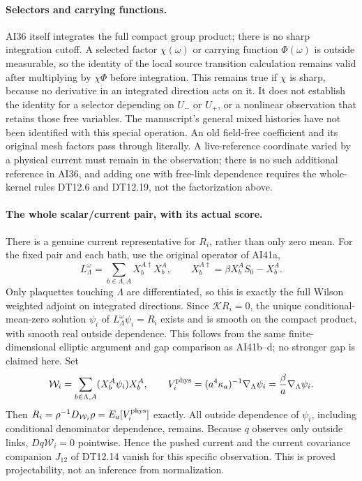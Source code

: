 \documentclass[11pt]{article}
\begin{document}
\paragraph{Selectors and carrying functions.}
AI36 itself integrates the full compact group product; there is no sharp integration cutoff.
A selected factor $\chi(\omega)$ or carrying function $\Phi(\omega)$ is outside measurable,
so the identity of the local source transition calculation remains valid after multiplying by $\chi\Phi$ before integration.
This remains true if $\chi$ is sharp, because no derivative in an integrated direction
acts on it. It does not establish the identity for a selector depending on $U_-$ or $U_+$,
or a nonlinear observation that retains those free variables. The manuscript's general
mixed histories have not been identified with this special operation.
An old field-free coefficient and its original mesh factors pass through literally.
A live-reference coordinate varied by a physical current must remain in the observation;
there is no such additional reference in AI36, and adding one with free-link dependence
requires the whole-kernel rules DT12.6 and DT12.19, not the factorization above.

\paragraph{The whole scalar/current pair, with its actual score.}
There is a genuine current representative for $R_i$, rather than only zero mean.
For the fixed pair and each bath, use the original operator of AI41a,
\[
 L^\omega_\Lambda=\sum_{b\in\Lambda,A}X_b^{A\dagger}X_b^A,
 \qquad X_b^{A\dagger}=\beta X_b^AS_0-X_b^A.
\]
Only plaquettes touching $\Lambda$ are differentiated, so this is exactly the full
Wilson weighted adjoint on integrated directions. Since $\mathcal K R_i=0$, the
unique conditional-mean-zero solution $\psi_i$ of $L^\omega_\Lambda\psi_i=R_i$
exists and is smooth on the compact product, with smooth real outside dependence.
This follows from the same finite-dimensional elliptic argument and gap comparison as
AI41b--d; no stronger gap is claimed here. Set
\[
 \mathcal W_i=\sum_{b\in\Lambda,A}(X_b^A\psi_i)X_b^A,
 \qquad V_i^{\rm phys}=(a^4\kappa_a)^{-1}\nabla_\Lambda\psi_i
                      =\frac\beta a\nabla_\Lambda\psi_i.
\]
Then $R_i=\rho^{-1}D_{\mathcal W_i}\rho=E_a[V_i^{\rm phys}]$ exactly.
All outside dependence of $\psi_i$, including conditional denominator dependence, remains.
Because $q$ observes only outside links, $Dq\mathcal W_i=0$ pointwise. Hence the
pushed current and the current covariance companion $J_{12}$ of DT12.14 vanish for this
specific observation. This is proved projectability, not an inference from normalization.
\end{document}
